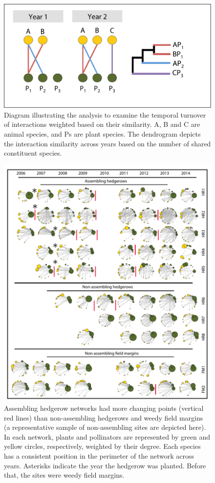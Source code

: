 \documentclass[12pt]{article}
\begin{document}
\clearpage
\begin{figure}
  \centering
  \includegraphics[width=.8\textwidth]{figures/scheme.pdf}
  \caption{Diagram illustrating the analysis to examine the temporal
    turnover of interactions weighted based on their similarity. A, B
    and C are animal species, and Ps are plant species. The dendrogram
    depicts the interaction similarity across years based on the
    number of shared constituent species.}
  \label{fig:methods}
\end{figure}
\clearpage


\begin{figure}
  \centering
  \includegraphics[width=1\textwidth]{figures/networksv1.pdf}
  \caption{Assembling hedgerow networks had more changing points
    (vertical red lines) than non-assembling hedgerows and weedy field
    margins (a representative sample of non-assembling sites are
    depicted here). In each network, plants and pollinators are
    represented by green and yellow circles, respectively, weighted by
    their degree. Each species has a consistent position in the
    perimeter of the network across years. Asterisks indicate the year
    the hedgerow was planted. Before that, the sites were weedy field
    margins.}
  \label{fig:changePoints}
\end{figure}
\clearpage
\end{document}
